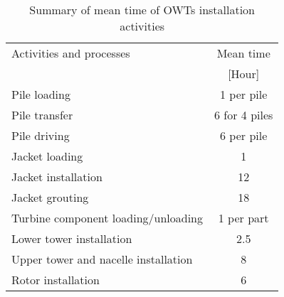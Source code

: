 
\begin{table}
\label{tab:times}

\begin{tabular}{lc}
\hline 
Activities and processes & Mean time \\ 
 & [Hour] \\ 
\hline 
Pile loading & 1 per pile \\
Pile transfer & 6 for 4 piles\\
Pile driving & 6 per pile\\
Jacket loading & 1\\
Jacket installation & 12\\
Jacket grouting & 18\\
Turbine component loading/unloading & 1 per part\\
Lower tower installation & 2.5\\
Upper tower and nacelle installation & 8\\
Rotor installation & 6\\
\hline 
\end{tabular} 

\caption{Summary of mean time of OWTs installation activities}
\end{table}
